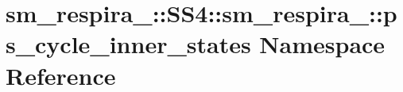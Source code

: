 \hypertarget{namespacesm__respira__1_1_1SS4_1_1sm__respira__1_1_1ps__cycle__inner__states}{}\section{sm\+\_\+respira\+\_\+:\+:S\+S4\+:\+:sm\+\_\+respira\+\_\+:\+:ps\+\_\+cycle\+\_\+inner\+\_\+states Namespace Reference}
\label{namespacesm__respira__1_1_1SS4_1_1sm__respira__1_1_1ps__cycle__inner__states}
